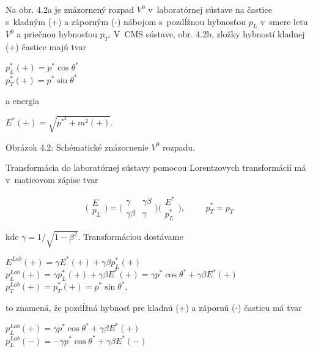 Na obr. 4.2a je znázornený rozpad $V^{0}$ v~laboratórnej sústave na častice
s~kladným (+) a záporným (-)  nábojom s~pozdĺžnou hybnosťou  $p_{L}$ v~smere
letu $V^{0}$ a priečnou hybnosťou $p_{T}$. V~CMS sústave, obr. 4.2b,  zložky
hybností kladnej (+) častice majú tvar
\begin{center}
  $ p_{L}^{*}(+)=p^{*}\cos\theta^{*}$ \\
  $ p_{T}^{*}(+)=p^{*}\sin\theta^{*}$
\end{center}
a energia
\begin{center}
  $ E^{*}(+)=\sqrt{p^{{*}^{2}} + m^{2}(+)}$.
\end{center}

\newpage
\begin{center}
  
\end{center}
\vspace{-6cm}
\begin{center}
  Obrázok 4.2: Schématické znázornenie $V^{0}$ rozpadu.
\end{center}
Transformácia do laboratórnej sústavy pomocou Lorentzovych transformácií má
v~maticovom zápise  tvar
\begin{center}
  $$ \Biggl( \begin{array}{c}
    E \\
    p_{L} \end{array} \Biggr) = \Biggl( \begin{array}{cc} \gamma &
    \gamma\beta \\ \gamma\beta & \gamma \end{array} \Biggr) \Biggl(
  \begin{array}{c} E^{*} \\ p_{L}^{*} \end{array} \Biggr), \hspace{1cm}
  p_{T}^{*}= p_{T} $$
\end{center}
kde $\gamma=1/\sqrt{1-\beta^{2}}$. Transformáciou dostávame
\begin{center}
  $E^{Lab}(+)=\gamma E^{*}(+) + \gamma\beta p_{L}^{*}(+)$ \\
  $p_{L}^{Lab}(+)=\gamma p_{L}^{*}(+) + \gamma\beta E^{*}(+) = \gamma
  p^{*}\cos
  \theta^{*} + \gamma\beta E^{*}(+)$ \\
  $p_{T}^{Lab}(+)=p_{T}^{*}(+)= p^{*}\sin\theta^{*},$
\end{center}
to znamená, že pozdĺžná hybnosť pre kladnú (+) a zápornú (-) časticu má tvar
\begin{center}
  $p_{L}^{Lab}(+)= \gamma p^{*}\cos  \theta^{*} + \gamma\beta E^{*}(+)$ \\
  $p_{L}^{Lab}(-)= -\gamma p^{*}\cos  \theta^{*} + \gamma\beta E^{*}(-)$
\end{center}
